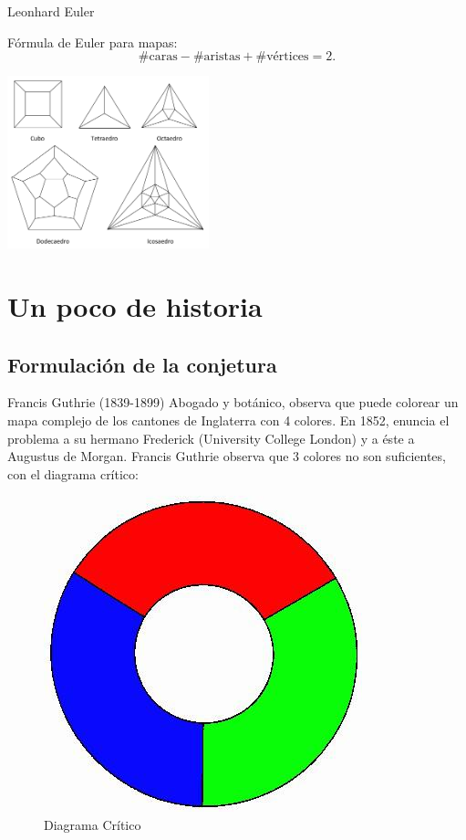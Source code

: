 \documentclass[spanish,utf8]{beamer}
\begin{document}
\begin{frame}{\insertsection}\transblindsvertical
Leonhard Euler
\begin{block}{Fórmula de Euler para mapas:}
$$
\#\text{caras} - \#\text{aristas} + \#\text{vértices} = 2.
$$
\end{block}
\begin{center}
   \includegraphics[height=5cm]{poliedros2.jpg}
\end{center}
\end{frame}

\section{Un poco de historia}

\subsection{Formulación de la conjetura}

\begin{frame}{\insertsection}\transblindsvertical
\begin{flushright}
	\begin{block}{Francis Guthrie (1839-1899)}
		Abogado y botánico, observa que puede colorear un mapa complejo de los cantones de Inglaterra con 4 colores. En 1852, enuncia el problema a su hermano Frederick (University College London) y a éste a Augustus de Morgan. Francis Guthrie observa que 3 colores no son suficientes, con el diagrama crítico:
	\end{block}
	\begin{figure}
		\includegraphics[scale=0.3]{diagrama.jpg}
		\caption{Diagrama Crítico}
	\end{figure}
\end{flushright}
\end{frame}
\end{document}
